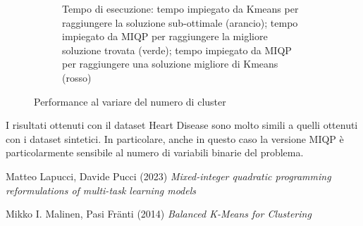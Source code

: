 \documentclass{article}
\begin{document}
\begin{figure}[H]
\begin{subfigure}[t]{0.49\linewidth}
         \caption{Tempo di esecuzione: tempo impiegato da Kmeans per raggiungere la soluzione sub-ottimale (arancio); tempo impiegato da MIQP per raggiungere la migliore soluzione trovata (verde); tempo impiegato da MIQP per raggiungere una soluzione migliore di Kmeans (rosso)}
     \end{subfigure}
        \label{fig:9}
        \caption{Performance al variare del numero di cluster}
     \end{figure}
    I risultati ottenuti con il dataset Heart Disease sono molto simili a quelli ottenuti con i dataset sintetici. In particolare, anche in questo caso la versione MIQP è particolarmente sensibile al numero di variabili binarie del problema.\\


    \begin{thebibliography}{9}
Matteo Lapucci, Davide Pucci (2023) \emph{Mixed-integer quadratic programming reformulations of multi-task learning models}

Mikko I. Malinen, Pasi Fränti (2014) \emph{Balanced K-Means for Clustering}

\end{thebibliography}
\end{document}
